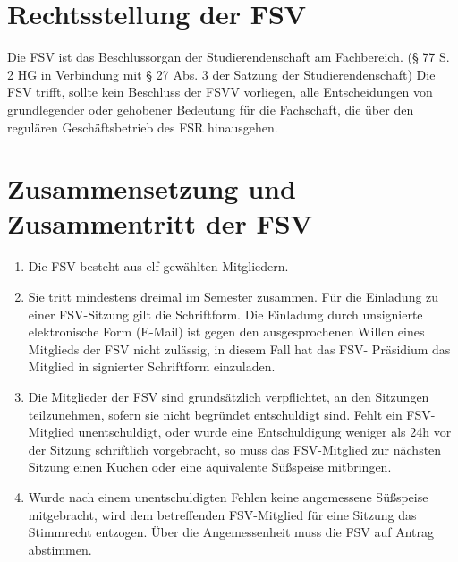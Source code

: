 \documentclass{article}
\begin{document}
\section{Rechtsstellung der FSV}\label{rechtsstellung-der-fsv}
Die FSV ist das Beschlussorgan der Studierendenschaft am Fachbereich. (§ 77 S. 2 HG in Verbindung mit § 27 Abs. 3 der Satzung der Studierendenschaft) Die FSV trifft, sollte kein Beschluss der FSVV vorliegen, alle Entscheidungen von grundlegender oder gehobener Bedeutung für die Fachschaft, die über den regulären Geschäftsbetrieb des FSR hinausgehen.

\section{Zusammensetzung und Zusammentritt der FSV}\label{zusammensetzung-und-zusammentritt-der-fsv}

\begin{enumerate}[(1)]
	\item Die FSV besteht aus elf gewählten Mitgliedern.
	\item Sie tritt mindestens dreimal im Semester zusammen. Für die Einladung zu einer FSV-Sitzung gilt die Schriftform. Die Einladung durch unsignierte elektronische Form (E-Mail) ist gegen den ausgesprochenen Willen eines Mitglieds der FSV nicht zulässig, in diesem Fall hat das FSV- Präsidium das Mitglied in signierter Schriftform einzuladen.
	\item Die Mitglieder der FSV sind grundsätzlich verpflichtet, an den Sitzungen teilzunehmen, sofern sie nicht begründet entschuldigt sind. Fehlt ein FSV-Mitglied unentschuldigt, oder wurde eine Entschuldigung weniger als 24h vor der Sitzung schriftlich vorgebracht, so muss das FSV-Mitglied zur nächsten Sitzung einen Kuchen oder eine äquivalente Süßspeise mitbringen.
	\item Wurde nach einem unentschuldigten Fehlen keine angemessene Süßspeise mitgebracht, wird dem betreffenden FSV-Mitglied für eine Sitzung das Stimmrecht entzogen. Über die Angemessenheit muss die FSV auf Antrag abstimmen.
\end{enumerate}
\end{document}
